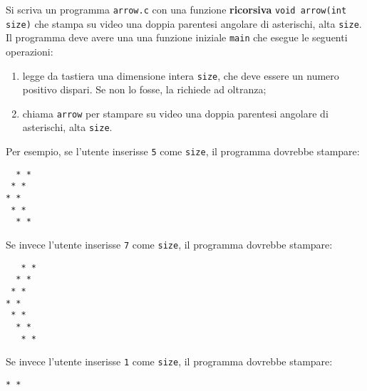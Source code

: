 \documentclass[12pt]{article}
\begin{document}
Si scriva un programma \texttt{arrow.c} con una funzione \textbf{ricorsiva}
\texttt{void arrow(int size)} che
stampa su video una doppia parentesi angolare di asterischi, alta \texttt{size}.
Il programma deve avere una
una funzione iniziale \texttt{main}
che esegue le seguenti operazioni:
\begin{enumerate}
\item legge da tastiera una dimensione intera \texttt{size}, che deve essere un numero positivo dispari. Se non lo fosse, la richiede ad oltranza;
\item chiama \texttt{arrow} per stampare su video una doppia parentesi angolare di asterischi, alta \texttt{size}.
\end{enumerate}

Per esempio, se l'utente inserisse \texttt{5} come \texttt{size}, il programma dovrebbe stampare:
%
\begin{mdframed}[backgroundcolor=lightgrey] 
\begin{verbatim}
  * *
 * *
* *
 * *
  * *
\end{verbatim}
\end{mdframed}

Se invece l'utente inserisse \texttt{7} come \texttt{size}, il programma dovrebbe stampare:
%
\begin{mdframed}[backgroundcolor=lightgrey]
\begin{verbatim}
   * *
  * *
 * *
* *
 * *
  * *
   * *
\end{verbatim}
\end{mdframed}

Se invece l'utente inserisse \texttt{1} come \texttt{size}, il programma dovrebbe stampare:
%
\begin{mdframed}[backgroundcolor=lightgrey]
\begin{verbatim}
* *
\end{verbatim}
\end{mdframed}
\end{document}
